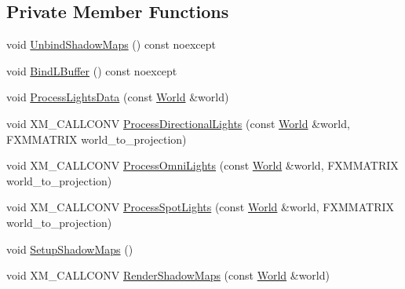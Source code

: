 \subsection*{Private Member Functions}
\begin{DoxyCompactItemize}
\item 
void \mbox{\hyperlink{classmage_1_1rendering_1_1_l_buffer_pass_ac456e0612e540d215d8c709e705ade20}{Unbind\+Shadow\+Maps}} () const noexcept
\item 
void \mbox{\hyperlink{classmage_1_1rendering_1_1_l_buffer_pass_a23370698fd80713b0ea31e1d54a35d44}{Bind\+L\+Buffer}} () const noexcept
\item 
void \mbox{\hyperlink{classmage_1_1rendering_1_1_l_buffer_pass_a1ec1d116e0b9ec1066faa7a2b3db5ca5}{Process\+Lights\+Data}} (const \mbox{\hyperlink{classmage_1_1rendering_1_1_world}{World}} \&world)
\item 
void X\+M\+\_\+\+C\+A\+L\+L\+C\+O\+NV \mbox{\hyperlink{classmage_1_1rendering_1_1_l_buffer_pass_a4dc551d7dfdef795244013e0086d59e1}{Process\+Directional\+Lights}} (const \mbox{\hyperlink{classmage_1_1rendering_1_1_world}{World}} \&world, F\+X\+M\+M\+A\+T\+R\+IX world\+\_\+to\+\_\+projection)
\item 
void X\+M\+\_\+\+C\+A\+L\+L\+C\+O\+NV \mbox{\hyperlink{classmage_1_1rendering_1_1_l_buffer_pass_af9e7e859505ec7ee16155f4e11d98a67}{Process\+Omni\+Lights}} (const \mbox{\hyperlink{classmage_1_1rendering_1_1_world}{World}} \&world, F\+X\+M\+M\+A\+T\+R\+IX world\+\_\+to\+\_\+projection)
\item 
void X\+M\+\_\+\+C\+A\+L\+L\+C\+O\+NV \mbox{\hyperlink{classmage_1_1rendering_1_1_l_buffer_pass_a3172ee6a91c34a1dbf252c388fe1ac20}{Process\+Spot\+Lights}} (const \mbox{\hyperlink{classmage_1_1rendering_1_1_world}{World}} \&world, F\+X\+M\+M\+A\+T\+R\+IX world\+\_\+to\+\_\+projection)
\item 
void \mbox{\hyperlink{classmage_1_1rendering_1_1_l_buffer_pass_a405734dad82467908e68217254e4f2ad}{Setup\+Shadow\+Maps}} ()
\item 
void X\+M\+\_\+\+C\+A\+L\+L\+C\+O\+NV \mbox{\hyperlink{classmage_1_1rendering_1_1_l_buffer_pass_a811b69ff4df7d8a24a042a9677c4b67f}{Render\+Shadow\+Maps}} (const \mbox{\hyperlink{classmage_1_1rendering_1_1_world}{World}} \&world)
\end{DoxyCompactItemize}
